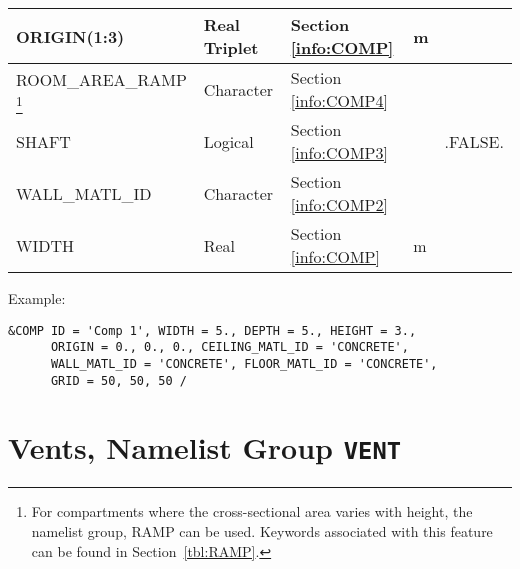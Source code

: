 \begin{minipage}{6.5in}
\begin{longtable}{|l|l|l|l|l@{\extracolsep{\fill}}|}
{\ct ORIGIN(1:3)}           & Real Triplet   & Section \ref{info:COMP}                & m         &                 \\ \hline
{\ct ROOM\_AREA\_RAMP}
\footnote{For compartments where the cross-sectional area varies with height, the namelist group, {\ct RAMP} can be used. Keywords associated with this feature can be found in Section~\ref{tbl:RAMP}.}
                            & Character          & Section \ref{info:COMP4}                 &           &                 \\ \hline
{\ct SHAFT}                 & Logical  		 & Section \ref{info:COMP3}                 &           & {\ct .FALSE.}   \\ \hline
{\ct WALL\_MATL\_ID}        & Character		 & Section \ref{info:COMP2}                 &           &                 \\ \hline
{\ct WIDTH}                 & Real               & Section \ref{info:COMP}                  & m         &                 \\ \hline
\end{longtable}
\end{minipage}

\vspace{\baselineskip}
\noindent Example:
\begin{lstlisting}
&COMP ID = 'Comp 1', WIDTH = 5., DEPTH = 5., HEIGHT = 3.,
      ORIGIN = 0., 0., 0., CEILING_MATL_ID = 'CONCRETE',
      WALL_MATL_ID = 'CONCRETE', FLOOR_MATL_ID = 'CONCRETE',
      GRID = 50, 50, 50 /
\end{lstlisting}




\clearpage
\section{Vents, Namelist Group \texorpdfstring{{\tt VENT}}{VENT}}
\label{info:VENT6}

